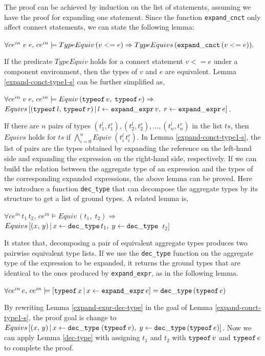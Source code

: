 {The proof can be achieved by induction on the list of statements,
assuming we have the proof for expanding one statement.
Since the function {\tt expand\_cnct} only affect connect statements,
we can state the following lemma:
\begin{lemma}\label{expand-conct-type1-s}
$\forall ce^{in}\;v\;e,\, ce^{in} \models TypeEquiv\,(v<=e) \Rightarrow TypeEquivs\, ({\tt expand\_cnct}\,(v<=e)).$
\end{lemma}
If the predicate $TypeEquiv$ holds for a connect statement $v<=e$ under a component environment,
then the types of $v$ and $e$ are equivalent.
Lemma \ref{expand-conct-type1-s} can be further simplified as,
\begin{lemma}\label{expand-conct-type1-s}
$\forall ce^{in}\;v\;e,\, ce^{in} \models Equiv\,({\tt typeof}\,v,\;{\tt typeof}\,e) \Rightarrow$
$Equivs\,[({\tt typeof}\,l,\,{\tt typeof}\,r)\,|\,l \leftarrow{\tt expand\_expr}\,v,\;r\leftarrow {\tt expand\_expr}\,e]$.
\end{lemma}
If there are $n$ pairs of types $(t_1^l,t_1^r),(t_2^l,t_2^r),\dots ,(t_n^l,t_n^r)$ in the list $ts$,
then $Equivs$ holds for $ts$ if
$\bigwedge_{i=0}^{n} Equiv\;(t_i^l\,t_i^r)$.
In Lemma \ref{expand-conct-type1-s}, the list of pairs are the types obtained by
expanding the reference on the left-hand side
and expanding the expression on the right-hand side, respectively.
If we can build the relation between the aggregate type of an expression and the types of
the corresponding expanded expressions, the above lemma can be proved.
Here we introduce a function {\tt dec\_type} that can decompose the aggregate types
by its structure to get a list of ground types.
A related lemma is,
\begin{lemma}\label{dec-type}
$\forall ce^{in}\, t_1\, t_2,\,ce^{in}\models Equiv\,(t_1,\;t_2) \Rightarrow$
$Equivs\,[(x,\,y)\,|\,x \leftarrow{\tt dec\_type}\,t_1,\;y\leftarrow {\tt dec\_type}\,$ $t_2]$
\end{lemma}
It states that, decomposing a pair of equivalent aggregate types produces two pairwise equivalent type lists.
If we use the {\tt dec\_type} function on the aggregate type of the expression  to be expanded, it
returns the ground types that are identical to the ones produced by {\tt expand\_expr}, as in the following lemma.
\begin{lemma}\label{expand-expr-dec-type}
$\forall ce^{in}\, e,\,ce^{in}\models[{\tt typeof}\,x\,|\,x\leftarrow{\tt expand\_expr}\,e] = {\tt dec\_type}\,({\tt typeof}\,e)$
\end{lemma}
By rewriting Lemma \ref{expand-expr-dec-type} in the goal of Lemma \ref{expand-conct-type1-s}, the proof goal is change to
$Equivs\,[(x,\,y)\,|\,x\leftarrow{\tt dec\_type}\;({\tt typeof}\,v),\;y\leftarrow {\tt dec\_type}\,({\tt typeof}\,e)]$.
Now we can apply Lemma \ref{dec-type} with assigning $t_1$ and $t_2$ with ${\tt typeof}\,v$ and ${\tt typeof}\,e$
to complete the proof.

}
